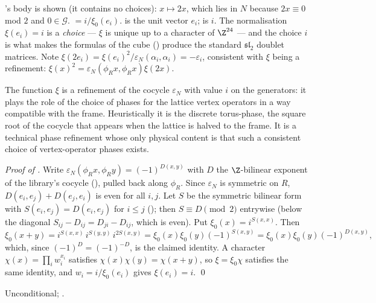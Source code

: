 \begin{dictionary}
's body is shown (it contains no choices): $x\mapsto2x$, which lies in $N$ because $2x\equiv0$
mod $2$ and $0\in\mathcal G$.  $=i/\xi_0(e_i)$.  is the unit vector $e_i$;
 is $i$. The normalisation $\xi(e_i)=i$ is a \emph{choice} --- $\xi$ is unique up to a character
of $\Z^{24}$ --- and the choice $i$ is what makes the formulas of the cube () produce the standard
$\mathfrak{sl}_2$ doublet matrices. Note $\xi(2e_i)=\xi(e_i)^2/\varepsilon_N(\alpha_i,\alpha_i)=-\varepsilon_i$, consistent with $\xi$ being a
refinement: $\xi(x)^2=\varepsilon_N(\phi_Rx,\phi_Rx)\xi(2x)$.
\end{dictionary}
\begin{physics}
The function $\xi$ is a refinement of the cocycle $\varepsilon_N$ with value $i$ on the generators: it plays the role of the choice of phases for the lattice vertex operators in a way compatible with the frame. Heuristically it is the discrete torus-phase, the square root of the cocycle that appears when the lattice is halved to the frame. It is a technical phase refinement whose only physical content is that such a consistent choice of vertex-operator phases exists.
\end{physics}
\noindent\emph{Proof of .} Write $\varepsilon_N(\phi_Rx,\phi_Ry)=(-1)^{D(x,y)}$ with $D$ the
$\Z$-bilinear exponent of the library's cocycle (), pulled back along $\phi_R$. Since
$\varepsilon_N$ is symmetric on $R$, $D(e_i,e_j)+D(e_j,e_i)$ is even for all $i,j$. Let $S$ be the symmetric
bilinear form with $S(e_i,e_j)=D(e_i,e_j)$ for $i\le j$ (); then $S\equiv D\pmod 2$ entrywise
(below the diagonal $S_{ij}-D_{ij}=D_{ji}-D_{ij}$, which is even). Put $\xi_0(x)=i^{S(x,x)}$. Then
\begin{equation*}
  \xi_0(x+y)=i^{S(x,x)}\,i^{S(y,y)}\,i^{2S(x,y)}=\xi_0(x)\xi_0(y)(-1)^{S(x,y)}=\xi_0(x)\xi_0(y)(-1)^{D(x,y)},
\end{equation*}
which, since $(-1)^{D}=(-1)^{-D}$, is the claimed identity. A character $\chi(x)=\prod_iw_i^{x_i}$ satisfies
$\chi(x)\chi(y)=\chi(x+y)$, so $\xi=\xi_0\chi$ satisfies the same identity, and $w_i=i/\xi_0(e_i)$ gives
$\xi(e_i)=i$. \qed
\begin{status}Unconditional; .\end{status}


